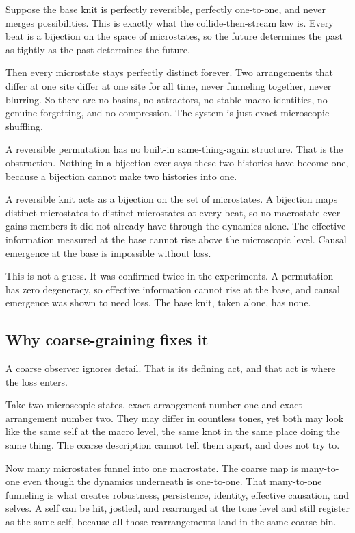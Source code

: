 Suppose the base knit is perfectly reversible, perfectly one-to-one, and never merges possibilities. This is exactly what the collide-then-stream law is. Every beat is a bijection on the space of microstates, so the future determines the past as tightly as the past determines the future.

Then every microstate stays perfectly distinct forever. Two arrangements that differ at one site differ at one site for all time, never funneling together, never blurring. So there are no basins, no attractors, no stable macro identities, no genuine forgetting, and no compression. The system is just exact microscopic shuffling.

A reversible permutation has no built-in same-thing-again structure. That is the obstruction. Nothing in a bijection ever says these two histories have become one, because a bijection cannot make two histories into one.

\begin{theorem}
A reversible knit acts as a bijection on the set of microstates. A bijection maps distinct microstates to distinct microstates at every beat, so no macrostate ever gains members it did not already have through the dynamics alone. The effective information measured at the base cannot rise above the microscopic level. Causal emergence at the base is impossible without loss.
\end{theorem}

This is not a guess. It was confirmed twice in the experiments. A permutation has zero degeneracy, so effective information cannot rise at the base, and causal emergence was shown to need loss. The base knit, taken alone, has none.

\subsection{Why coarse-graining fixes it}

A coarse observer ignores detail. That is its defining act, and that act is where the loss enters.

Take two microscopic states, exact arrangement number one and exact arrangement number two. They may differ in countless tones, yet both may look like the same self at the macro level, the same knot in the same place doing the same thing. The coarse description cannot tell them apart, and does not try to.

Now many microstates funnel into one macrostate. The coarse map is many-to-one even though the dynamics underneath is one-to-one. That many-to-one funneling is what creates robustness, persistence, identity, effective causation, and selves. A self can be hit, jostled, and rearranged at the tone level and still register as the same self, because all those rearrangements land in the same coarse bin.

